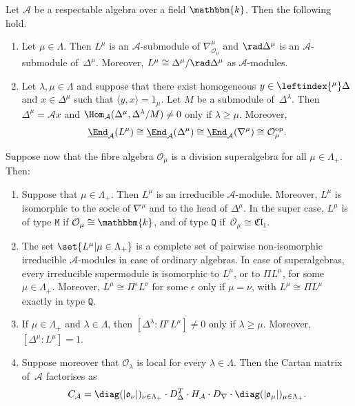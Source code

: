 \documentclass[a4paper,11pt]{amsart}
\newcommand{\uEnd}{\underline{\End}}
\let\<\langle
\let\>\rangle
\numberwithin{equation}{subsection}
\theoremstyle{definition}
\theoremstyle{theorem}
\theoremstyle{remark}
\newcommand\CA{\mathcal{A}}
\newcommand\CO{\mathcal{O}}
\newcommand\Olam[1][\lambda]{\CO_{#1}}
\newcommand\olam[1][\lambda]{\mathfrak{o}_{#1}}
\newcommand\kk{\mathbbm{k}}
\begin{document}
\begin{Theorem}\label{T:Respectable}Let $\CA$ be a respectable algebra over a field $\kk$. Then the following hold.
\begin{enumerate}
  \item\label{late1}  Let $\mu\in\Lambda$. Then $L^\mu$ is an
         $\CA$-submodule of $\nabla^\mu_{\Olam[\mu]}$ and $\rad\Delta^\mu$ is
         an $\CA$-submodule of~$\Delta^\mu$. Moreover,
         $L^\mu\cong\Delta^\mu/\rad\Delta^\mu$ as
         $\CA$-modules.
  \item\label{late2}  Let $\lambda,\mu\in\Lambda$ and
  suppose that there exist homogeneous $y\in\leftindex{^\mu}\Delta$ and $x\in\Delta^\mu$
  such that $\<y,x\>=1_\mu$. Let $M$ be a submodule of~$\Delta^\lambda$. Then
  $\Delta^\mu=\CA x$ and $\Hom_{\CA}(\Delta^\mu,\Delta^\lambda/M)\ne0$ only if
  $\lambda\ge\mu$. Moreover,
  \[
     \uEnd_{\CA}(L^\mu)\cong\uEnd_{\CA}(\Delta^\mu)\cong\uEnd_{\CA}(\nabla^\mu)\cong\Olam[\mu]^{\mathrm{op}}.
  \]
\end{enumerate}
Suppose now that the fibre algebra $\Olam[\mu]$ is a division
superalgebra for all $\mu\in\Lambda_+$. Then:
\begin{enumerate}[start=3]
  \item\label{late3} Suppose that $\mu\in\Lambda_+$. Then $L^\mu$ is an
  irreducible $\CA$-module. Moreover, $L^\mu$ is isomorphic to
  the socle of $\nabla^\mu$ and to the head of $\Delta^\mu$. In the
  super case, $L^\mu$ is of type $\mathtt{M}$ if $\Olam[\mu]\cong\kk$,
  and of type $\mathtt{Q}$ if~$\Olam[\mu]\cong\mathfrak{Cl}_1$.
  \item\label{late4}  The set $\set{L^\mu|\mu\in\Lambda_+}$ is a
  complete set of pairwise non-isomorphic irreducible
  $\CA$-modules in case of ordinary algebras. In case of
  superalgebras, every irreducible supermodule is isomorphic to $L^\mu$,
  or to $\Pi L^\mu$, for some $\mu\in\Lambda_+$. Moreover,
  $L^\mu\cong\Pi^\epsilon L^\nu$ for some $\epsilon$ only if $\mu=\nu$,
  with $L^\mu\cong\Pi L^\mu$ exactly in type $\mathtt Q$.
  \item\label{late5}  If $\mu\in\Lambda_+$ and $\lambda\in\Lambda$, then
  $[\Delta^\lambda:\Pi^\epsilon L^\mu]\ne0$ only if $\lambda\ge\mu$.
  Moreover, $[\Delta^\mu:L^\mu]=1$.
  \item\label{late6}  Suppose moreover that $\Olam$ is local for every $\lambda\in\Lambda$. Then the Cartan matrix of~$\CA$ factorises as
  \[
     C_{\CA}=\diag(|\olam[\nu]|)_{\nu\in\Lambda_+}
         \cdot D_\Delta^T\cdot  H_{\CA}
         \cdot D_\nabla\cdot \diag(|\olam[\mu]|)_{\mu\in\Lambda_+}.
  \]
\end{enumerate}
\end{Theorem}
\end{document}
